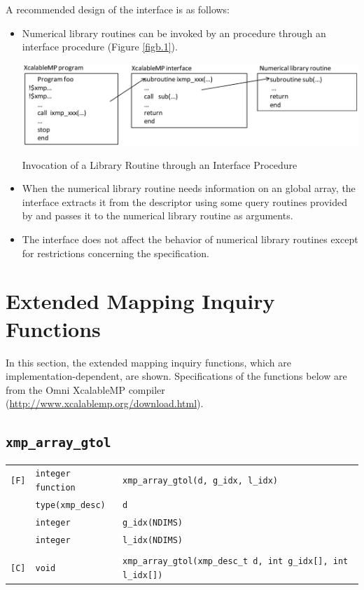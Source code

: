 A recommended design of the interface is as follows:

\begin{itemize}

 \item Numerical library routines can be invoked by an {\XMP} procedure
       through an interface procedure (Figure \ref{figb.1}).

 \begin{myfigure}
  \includegraphics[scale=0.45]{figs/figb.1.eps}
  \caption{Invocation of a Library Routine through an Interface Procedure}
  \label{figb.1}
 \end{myfigure}

 \item When the numerical library routine needs information on an global
       array, the interface extracts it from the descriptor using some
       query routines provided by {\XMP} and passes it to the
       numerical library routine as arguments.
%
 \item The interface does not affect the behavior of numerical library
       routines except for restrictions concerning the {\XMP}
       specification.
\end{itemize}


\section{Extended Mapping Inquiry Functions}

In this section, the extended mapping inquiry functions, which are
implementation-dependent, are shown.
Specifications of the functions below are from the Omni XcalableMP
compiler (\url{http://www.xcalablemp.org/download.html}).

\subsection{\tt xmp\_array\_gtol}

\begin{tabular}{lll}

\verb![F]!& {\tt integer function} & {\tt xmp\_array\_gtol(d, g\_idx, l\_idx)} \\
          & {\tt type(xmp\_desc)} & {\tt d}\\
          & {\tt integer} & {\tt g\_idx(NDIMS)}\\
          & {\tt integer} & {\tt l\_idx(NDIMS)}\\
          & & \\
\verb![C]!&  {\tt void} & {\tt xmp\_array\_gtol(xmp\_desc\_t d, int g\_idx[], int l\_idx[])}

\end{tabular}

